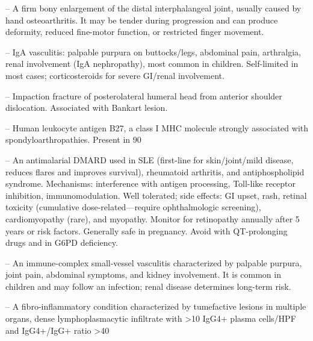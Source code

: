 -- A firm bony enlargement of the distal interphalangeal joint, usually caused by hand osteoarthritis. It may be tender during progression and can produce deformity, reduced fine-motor function, or restricted finger movement.

-- IgA vasculitis: palpable purpura on buttocks/legs, abdominal pain, arthralgia, renal involvement (IgA nephropathy), most common in children. Self-limited in most cases; corticosteroids for severe GI/renal involvement.


-- Impaction fracture of posterolateral humeral head from anterior shoulder dislocation. Associated with Bankart lesion.

-- Human leukocyte antigen B27, a class I MHC molecule strongly associated with spondyloarthropathies. Present in 90%

-- An antimalarial DMARD used in SLE (first-line for skin/joint/mild disease, reduces flares and improves survival), rheumatoid arthritis, and antiphospholipid syndrome. Mechanisms: interference with antigen processing, Toll-like receptor inhibition, immunomodulation. Well tolerated; side effects: GI upset, rash, retinal toxicity (cumulative dose-related—require ophthalmologic screening), cardiomyopathy (rare), and myopathy. Monitor for retinopathy annually after 5 years or risk factors. Generally safe in pregnancy. Avoid with QT-prolonging drugs and in G6PD deficiency.

-- An immune-complex small-vessel vasculitis characterized by palpable purpura, joint pain, abdominal symptoms, and kidney involvement. It is common in children and may follow an infection; renal disease determines long-term risk.

-- A fibro-inflammatory condition characterized by tumefactive lesions in multiple organs, dense lymphoplasmacytic infiltrate with >10 IgG4+ plasma cells/HPF and IgG4+/IgG+ ratio >40%


